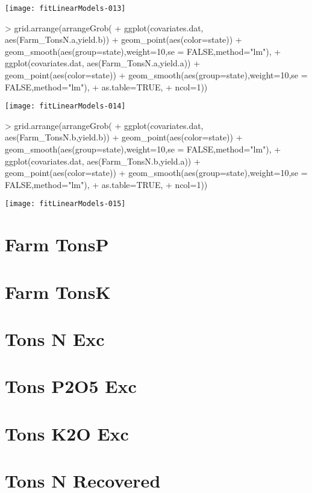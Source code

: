 \documentclass{report}
\begin{document}
\texttt{[image: fitLinearModels-013]}

\begin{Schunk}
\begin{Sinput}
> grid.arrange(arrangeGrob(
+   ggplot(covariates.dat, aes(Farm_TonsN.a,yield.b)) + geom_point(aes(color=state)) + geom_smooth(aes(group=state),weight=10,se = FALSE,method="lm"),
+   ggplot(covariates.dat, aes(Farm_TonsN.a,yield.a)) + geom_point(aes(color=state)) + geom_smooth(aes(group=state),weight=10,se = FALSE,method="lm"),
+    as.table=TRUE,
+    ncol=1))
\end{Sinput}
\end{Schunk}
\texttt{[image: fitLinearModels-014]}

\begin{Schunk}
\begin{Sinput}
> grid.arrange(arrangeGrob(
+   ggplot(covariates.dat, aes(Farm_TonsN.b,yield.b)) + geom_point(aes(color=state)) + geom_smooth(aes(group=state),weight=10,se = FALSE,method="lm"),
+   ggplot(covariates.dat, aes(Farm_TonsN.b,yield.a)) + geom_point(aes(color=state)) + geom_smooth(aes(group=state),weight=10,se = FALSE,method="lm"),
+    as.table=TRUE,
+    ncol=1))
\end{Sinput}
\end{Schunk}
\texttt{[image: fitLinearModels-015]}

\section*{Farm TonsP}


\section*{Farm TonsK}

\section*{Tons N Exc}

\section*{Tons P2O5 Exc}

\section*{Tons K2O Exc}

\section*{Tons N Recovered}
\end{document}
